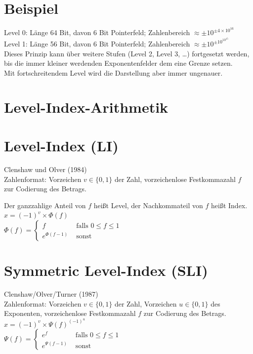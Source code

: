 \documentclass[10pt]{article}
\begin{document}
\section*{Beispiel}
Level 0: Länge 64 Bit, davon 6 Bit Pointerfeld; Zahlenbereich $\approx \pm 10^{ \pm 4 \times 10^{16}}$\\
Level 1: Länge 56 Bit, davon 6 Bit Pointerfeld; Zahlenbereich $\approx \pm 10^{ \pm 10^{10^{15}}}$\\
Dieses Prinzip kann über weitere Stufen (Level 2, Level 3, …) fortgesetzt werden, bis die immer kleiner werdenden Exponentenfelder dem eine Grenze setzen.\\
Mit fortschreitendem Level wird die Darstellung aber immer ungenauer.

\section*{Level-Index-Arithmetik}
\section*{Level-Index (LI)}
Clenshaw und Olver (1984)\\
Zahlenformat: Vorzeichen $v \in\{0,1\}$ der Zahl, vorzeichenlose Festkommazahl $f$ zur Codierung des Betrags.

Der ganzzahlige Anteil von $f$ heißt Level, der Nachkommateil von $f$ heißt Index.\\
$x=(-1)^{v} \times \Phi(f)$\\
$\Phi(f)= \begin{cases}f & \text { falls } 0 \leq f \leq 1 \\ e^{\Phi(f-1)} & \text { sonst }\end{cases}$

\section*{Symmetric Level-Index (SLI)}
Clenshaw/Olver/Turner (1987)\\
Zahlenformat: Vorzeichen $v \in\{0,1\}$ der Zahl, Vorzeichen $u \in\{0,1\}$ des Exponenten, vorzeichenlose Festkommazahl $f$ zur Codierung des Betrags.\\
$x=(-1)^{v} \times \Psi(f)^{(-1)^{u}}$\\
$\Psi(f)= \begin{cases}e^{f} & \text { falls } 0 \leq f \leq 1 \\ e^{\Psi(f-1)} & \text { sonst }\end{cases}$
\end{document}
